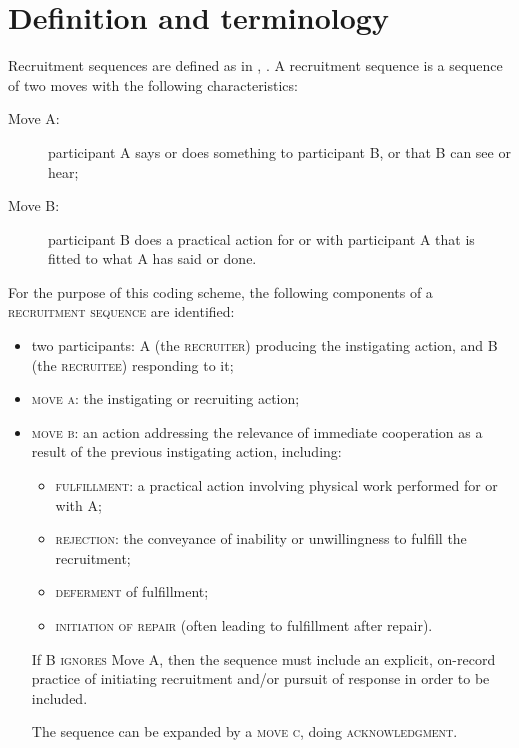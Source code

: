 \documentclass[output=paper]{langsci/langscibook}
\begin{document}
\section{Definition and terminology}\label{sec:coding:2}

Recruitment sequences are defined as in , . A recruitment sequence is a sequence of two moves with the following characteristics:

\begin{description}
\item[Move A:] participant A says or does something to participant B, or that B can see or hear;
\item[Move B:] participant B does a practical action for or with participant A that is fitted to what A has said or done.
\end{description}

For the purpose of this coding scheme, the following components of a \textsc{recruitment sequence} are identified:

\begin{itemize}
\item two participants: \textsc{A} (the \textsc{recruiter}) producing the instigating action, and \textsc{B} (the \textsc{recruitee}) responding to it;
\item \textsc{move a}: the instigating or recruiting action;
\item \textsc{move b}: an action addressing the relevance of immediate cooperation as a result of the previous instigating action, including:

\begin{itemize}
\item \textsc{fulfillment}: a practical action involving physical work performed for or with A;
\item \textsc{rejection}: the conveyance of inability or unwillingness to fulfill the recruitment;
\item \textsc{deferment} of fulfillment;
\item \textsc{initiation of repair} (often leading to fulfillment after repair).
\end{itemize}

If B \textsc{ignores} Move A, then the sequence must include an explicit, on-record practice of initiating recruitment and/or pursuit of response in order to be included.

The sequence can be expanded by a \textsc{move c}, doing \textsc{acknowledgment}.
\end{itemize}
\end{document}
